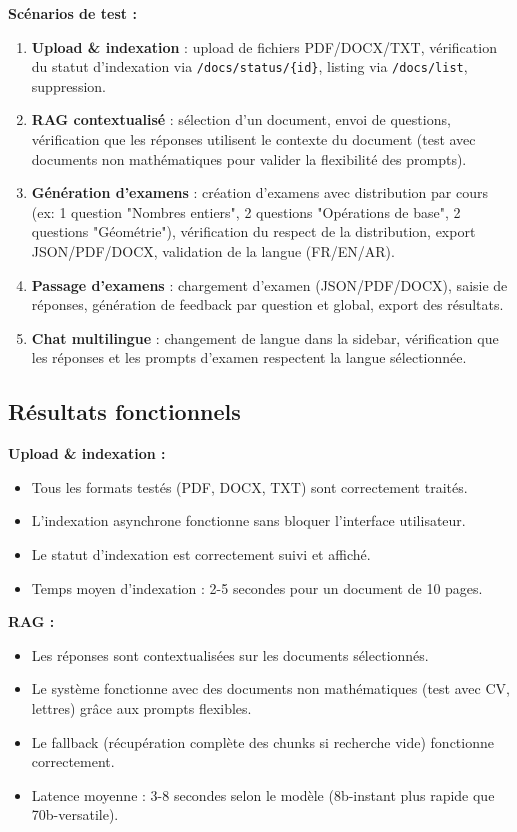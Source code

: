 \textbf{Scénarios de test :}
\begin{enumerate}
    \item \textbf{Upload \& indexation} : upload de fichiers PDF/DOCX/TXT, vérification du statut d'indexation via \texttt{/docs/status/\{id\}}, listing via \texttt{/docs/list}, suppression.
    \item \textbf{RAG contextualisé} : sélection d'un document, envoi de questions, vérification que les réponses utilisent le contexte du document (test avec documents non mathématiques pour valider la flexibilité des prompts).
    \item \textbf{Génération d'examens} : création d'examens avec distribution par cours (ex: 1 question "Nombres entiers", 2 questions "Opérations de base", 2 questions "Géométrie"), vérification du respect de la distribution, export JSON/PDF/DOCX, validation de la langue (FR/EN/AR).
    \item \textbf{Passage d'examens} : chargement d'examen (JSON/PDF/DOCX), saisie de réponses, génération de feedback par question et global, export des résultats.
    \item \textbf{Chat multilingue} : changement de langue dans la sidebar, vérification que les réponses et les prompts d'examen respectent la langue sélectionnée.
\end{enumerate}

\subsection{Résultats fonctionnels}

\textbf{Upload \& indexation :}
\begin{itemize}
    \item Tous les formats testés (PDF, DOCX, TXT) sont correctement traités.
    \item L'indexation asynchrone fonctionne sans bloquer l'interface utilisateur.
    \item Le statut d'indexation est correctement suivi et affiché.
    \item Temps moyen d'indexation : 2-5 secondes pour un document de 10 pages.
\end{itemize}

\textbf{RAG :}
\begin{itemize}
    \item Les réponses sont contextualisées sur les documents sélectionnés.
    \item Le système fonctionne avec des documents non mathématiques (test avec CV, lettres) grâce aux prompts flexibles.
    \item Le fallback (récupération complète des chunks si recherche vide) fonctionne correctement.
    \item Latence moyenne : 3-8 secondes selon le modèle (8b-instant plus rapide que 70b-versatile).
\end{itemize}

